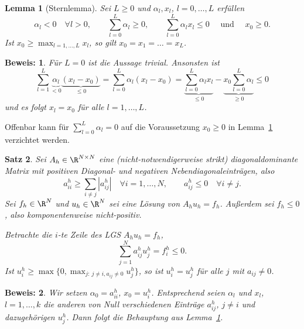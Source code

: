 \documentclass[
]{mycourse}
\theoremstyle{mythm}
\newtheorem{theorem}{Satz}[chapter]
\newtheorem{lemma}[theorem]{Lemma}
\theoremstyle{break}
\newtheorem*{beweis}{Beweis:}
\begin{document}
\begin{lemma}[Sternlemma]\label{lemma:stern}
Sei $L\geq 0$ und $\alpha_l,x_l$, $l=0,\ldots,L$ erfüllen
\[
\alpha_l<0 \quad \forall l>0,\qquad \sum_{l=0}^L \alpha_l\geq 0, \qquad
\sum_{l=0}^L \alpha_l x_l\leq 0 \quad \mbox{ und } \quad x_0\geq 0.
\]
Ist $x_0\geq \max_{l=1,\ldots,L} x_l$, so gilt $x_0=x_1=\ldots=x_L$.
\end{lemma}
\begin{beweis}
Für $L=0$ ist die Aussage trivial. Ansonsten ist
\[
\sum_{l=1}^L \underbrace{\alpha_l}_{< 0} \underbrace{(x_l - x_0)}_{\leq 0}=\sum_{l=0}^L \alpha_l (x_l - x_0)=\underbrace{\sum_{l=0}^L \alpha_l x_l}_{\leq 0} - \underbrace{x_0\sum_{l=0}^L\alpha_l}_{\geq 0}\leq 0
\]
und es folgt $x_l=x_0$ für alle $l=1,\ldots,L$.
\end{beweis}
Offenbar kann für $\sum_{l=0}^L\alpha_l=0$ auf die Voraussetzung $x_0\geq 0$ in Lemma~\ref{lemma:stern} verzichtet werden.

\begin{theorem}\label{thm:diskretes_maxprinzip}
Sei $A_h\in \R^{N\times N}$ eine (nicht-notwendigerweise strikt) diagonaldominante Matrix mit positiven Diagonal- und negativen 
Nebendiagonaleinträgen, also
\[
a^h_{ii}\geq \sum_{i\neq j} |a^h_{ij}|  \quad \forall i=1,\ldots,N, \qquad a^h_{ij}\leq 0 \quad \forall i\neq j.
\]
Sei $f_h\in \R^{N}$ und $u_h\in \R^N$ sei eine Lösung von $A_h u_h=f_h$. Außerdem sei $f_h\leq 0$, also komponentenweise 
nicht-positiv. 

Betrachte die $i$-te Zeile des LGS $A_h u_h =f_h$,
\[
\sum_{j=1}^N a^h_{ij} u^{h}_j =f^h_i\leq 0.
\]
Ist $u^h_i\geq \max\{0,\max_{j:\ j\neq i, a_{ij}\neq 0} u^h_j\}$, so 
ist $u^h_i=u^h_j$ für alle $j$ mit $a_{ij}\neq 0$.
\end{theorem}
\begin{beweis}
Wir setzen $\alpha_0=a^h_{ii}$, $x_0=u^h_i$. Entsprechend seien $\alpha_l$ und $x_l$, $l=1,\ldots,k$ die anderen
von Null verschiedenen Einträge $a^h_{ij}$, $j\neq i$ und dazugehörigen $u^h_j$. Dann folgt die Behauptung aus
Lemma~\ref{lemma:stern}.
\end{beweis}
\end{document}
